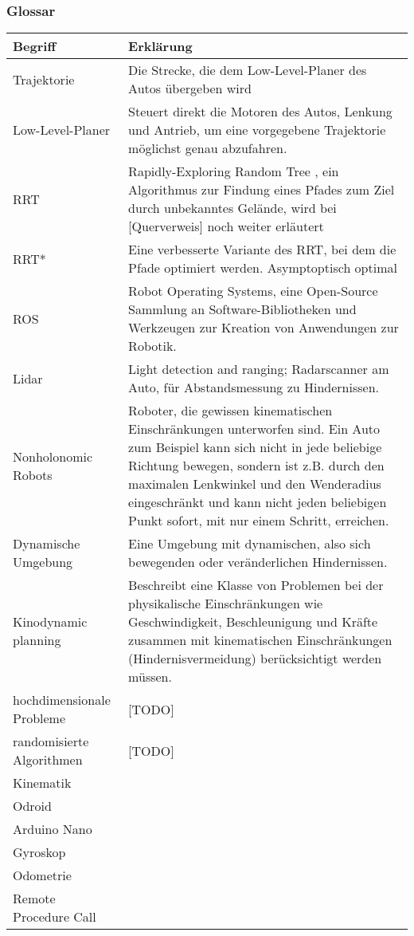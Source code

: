 \subsubsection{Glossar}
\begin{tabularx}{\textwidth}{l|X}
 \textbf{Begriff}  & \textbf{Erklärung}  \\
\hline Trajektorie & Die Strecke, die dem Low-Level-Planer des Autos übergeben wird\\
Low-Level-Planer & Steuert direkt die Motoren des Autos, Lenkung und Antrieb, um eine vorgegebene Trajektorie möglichst genau abzufahren. \\
RRT & Rapidly-Exploring Random Tree \citep{Lav98}, ein Algorithmus zur Findung eines Pfades zum Ziel durch unbekanntes Gelände, wird bei [Querverweis] noch weiter erläutert\\
RRT* & Eine verbesserte Variante des RRT, bei dem die Pfade optimiert werden. Asymptoptisch optimal \citep{Bernd} \\
ROS & Robot Operating Systems, eine Open-Source Sammlung an Software-Bibliotheken und Werkzeugen zur 	Kreation von Anwendungen zur Robotik. \\
Lidar & Light detection and ranging; Radarscanner am Auto, für Abstandsmessung zu Hindernissen.\\
Nonholonomic Robots & Roboter, die gewissen kinematischen Einschränkungen unterworfen sind. Ein Auto zum Beispiel kann sich nicht in jede beliebige Richtung bewegen, sondern ist z.B. durch den maximalen Lenkwinkel und den Wenderadius eingeschränkt und kann nicht jeden beliebigen Punkt sofort, mit nur einem Schritt, erreichen.  \\
Dynamische Umgebung & Eine Umgebung mit dynamischen, also sich bewegenden oder veränderlichen Hindernissen. \\
Kinodynamic planning & Beschreibt eine Klasse von Problemen bei der physikalische Einschränkungen wie Geschwindigkeit, Beschleunigung und Kräfte zusammen mit kinematischen Einschränkungen (Hindernisvermeidung) berücksichtigt werden müssen. \\
hochdimensionale Probleme & [TODO]\\
randomisierte Algorithmen & [TODO]\\
Kinematik & \\
Odroid & \\
Arduino Nano & \\
Gyroskop & \\
Odometrie & \\
Remote Procedure Call & \\

\end{tabularx} 
